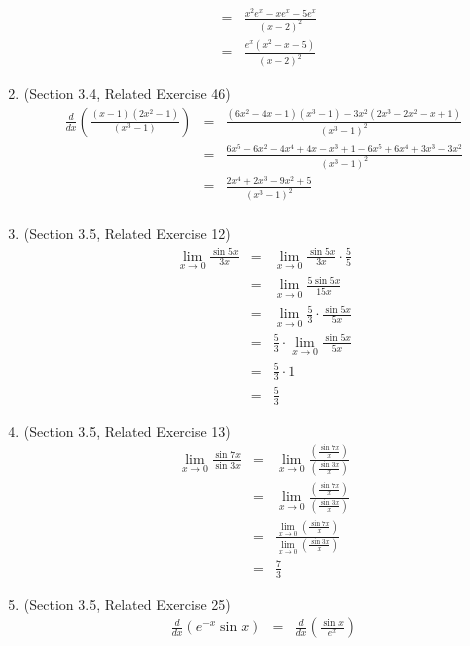 \documentclass{article}
\begin{document}
\begin{enumerate}
\begin{eqnarray}
            &=& \frac{x^2e^x - xe^x - 5e^x}{(x - 2)^2} \\
            &=& \frac{e^x(x^2 - x - 5)}{(x - 2)^2}
        \end{eqnarray}
    \item (Section 3.4, Related Exercise 46)
        \begin{eqnarray}
            \frac{d}{dx}\left(\frac{(x - 1)(2x^2 - 1)}{(x^3 - 1)}\right) &=& \frac{(6x^2-4x-1)(x^3-1) - 3x^2(2x^3 - 2x^2 - x + 1)}{(x^3 - 1)^2} \\
            &=& \frac{6x^5 - 6x^2 - 4x^4 + 4x - x^3 + 1 - 6x^5 + 6x^4 + 3x^3 - 3x^2}{(x^3 - 1)^2} \\
            &=& \frac{2x^4 + 2x^3 - 9x^2 + 5}{(x^3 - 1)^2} \\
        \end{eqnarray}
    \item (Section 3.5, Related Exercise 12)
        \begin{eqnarray}
            \lim_{x \to 0}{\frac{\sin{5x}}{3x}} &=& \lim_{x \to 0}{\frac{\sin{5x}}{3x} \cdot \frac{5}{5}} \\
            &=& \lim_{x \to 0}{\frac{5\sin{5x}}{15x}} \\
            &=& \lim_{x \to 0}{\frac{5}{3} \cdot \frac{\sin{5x}}{5x}} \\
            &=& \frac{5}{3} \cdot \lim_{x \to 0}{\frac{\sin{5x}}{5x}} \\
            &=& \frac{5}{3} \cdot 1 \\
            &=& \frac{5}{3}
        \end{eqnarray}
    \item (Section 3.5, Related Exercise 13)
        \begin{eqnarray}
            \lim_{x \to 0}{\frac{\sin{7x}}{\sin{3x}}} &=& \lim_{x \to 0}{\frac{\left(\frac{\sin{7x}}{x}\right)}{\left(\frac{\sin{3x}}{x}\right)}} \\
            &=& \lim_{x \to 0}{\frac{\left(\frac{\sin{7x}}{x}\right)}{\left(\frac{\sin{3x}}{x}\right)}} \\
            &=& \frac{\lim_{x \to 0}{\left(\frac{\sin{7x}}{x}\right)}}{\lim_{x \to 0}{\left(\frac{\sin{3x}}{x}\right)}} \\
            &=& \frac{7}{3}
        \end{eqnarray}
    \item (Section 3.5, Related Exercise 25)
        \begin{eqnarray}
            \frac{d}{dx}\left(e^{-x}\sin{x}\right) &=& \frac{d}{dx}\left(\frac{\sin{x}}{e^x}\right) \\

\end{eqnarray}
\end{enumerate}
\end{document}
